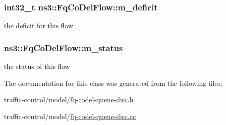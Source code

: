 \subsubsection[{\texorpdfstring{m\+\_\+deficit}{m_deficit}}]{\setlength{\rightskip}{0pt plus 5cm}int32\+\_\+t ns3\+::\+Fq\+Co\+Del\+Flow\+::m\+\_\+deficit\hspace{0.3cm}{\ttfamily [private]}}\hypertarget{classns3_1_1FqCoDelFlow_aae3d869b4299d6a74ed5cb5b65a73808}{}\label{classns3_1_1FqCoDelFlow_aae3d869b4299d6a74ed5cb5b65a73808}


the deficit for this flow 

\subsubsection[{\texorpdfstring{m\+\_\+status}{m_status}}]{ ns3\+::\+Fq\+Co\+Del\+Flow\+::m\+\_\+status\hspace{0.3cm}{\ttfamily [private]}}\hypertarget{classns3_1_1FqCoDelFlow_ab2a1d20e7e045afd3197e2ea74f70394}{}\label{classns3_1_1FqCoDelFlow_ab2a1d20e7e045afd3197e2ea74f70394}


the status of this flow 



The documentation for this class was generated from the following files\+:\begin{DoxyCompactItemize}
\item 
traffic-\/control/model/\hyperlink{fq-codel-queue-disc_8h}{fq-\/codel-\/queue-\/disc.\+h}\item 
traffic-\/control/model/\hyperlink{fq-codel-queue-disc_8cc}{fq-\/codel-\/queue-\/disc.\+cc}\end{DoxyCompactItemize}
